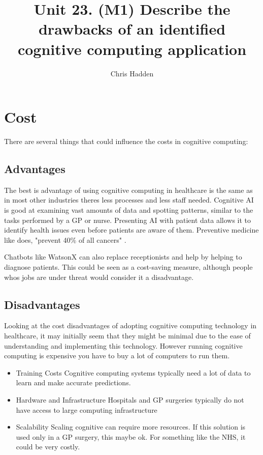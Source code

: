 \documentclass{article}
\title{Unit 23. (M1) Describe the drawbacks of an identified cognitive computing application}
\author{Chris Hadden}
\date{}
\begin{document}
\maketitle

\section{Cost}\label{cost}
There are several things that could influence the costs in cognitive computing:

\subsection{Advantages}
The best is advantage of using cognitive computing in healthcare is the same as in most other industries theres less processes and less staff needed. Cognitive AI is good at examining vast amounts of data and spotting patterns, similar to the tasks performed by a GP or nurse. Presenting AI with patient data allows it to identify health issues even before patients are aware of them. Preventive medicine like does, "prevent 40\% of all cancers" \cite{prevention}.

Chatbots like WatsonX can also replace receptionists and help by helping to diagnose patients. This could be seen as a cost-saving measure, although people whos jobs are under threat would consider it a disadvantage.

\subsection{Disadvantages}
Looking at the cost disadvantages of adopting cognitive computing technology in healthcare, it may initially seem that they might be minimal due to the ease of understanding and implementing this technology. However running cognitive computing is expensive you have to buy a lot of computers to run them.

\begin{itemize}
\item Training Costs Cognitive computing systems typically need a lot of data to learn and make accurate predictions. 

\item Hardware and Infrastructure Hospitals and GP surgeries typically do not have access to large computing infrastructure

\item Scalability Scaling cognitive can require more resources. If this solution is used only in a GP surgery, this maybe ok. For something like the NHS, it could be very costly.
\end{itemize}
\end{document}
